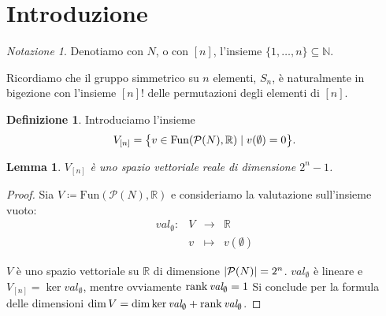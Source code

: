 \documentclass[a4paper,11pt]{article}
\theoremstyle{definition}				%
\newtheorem{definizione}{Definizione}%
\theoremstyle{remark}
\newtheorem*{notazione}{Notazione}
\theoremstyle{plain}
\newtheorem{lemma}{Lemma}%
\newcommand{\R}{\mathbb{R}}										%
\begin{document}
	\begin{abstract}
		In questo documento daremo la dimostrazione del Teorema di Shapley vista durante la lezione del 23/05/2023.
		
		Per dimostrare il teorema serviranno diversi risultati preliminari, non tutti visti a lezione.
		\smallskip

		Documento scritto e formattato in \LaTeX{} da Andrea Marino. 

		Ogni segnalazione di errori è più che bene accetta. Potete scrivermi per e-mail all'indirizzo 
		\texttt{a.marino47@studenti.unipi.it}
	\end{abstract}
	
	\section*{Introduzione}
	\begin{notazione}
		Denotiamo con $N$, o con $[n]$, l'insieme $\{1,\dots,n\}\subseteq\mathbb{N}$.
		
		Ricordiamo che il gruppo simmetrico su $n$ elementi, $S_n$, è naturalmente in bigezione con l'insieme $[n]!$ delle permutazioni degli elementi di $[n]$.
	\end{notazione}
	
	\begin{definizione}
		Introduciamo l'insieme 
		\[
			V_{[n]}=\qty\big{v\in\mathrm{Fun}\qty(\mathcal{P}(N),\R)\mid v(\emptyset)=0}.
		\]
	\end{definizione}
	
	\begin{lemma}\label{lemma:vectorspace}
		$V_{[n]}$ è uno spazio vettoriale reale di dimensione $2^n-1$.
	\end{lemma}
	\begin{proof}
		Sia $V\coloneqq\mathrm{Fun}\left(\mathcal{P}(N),\R\right)$ e consideriamo la valutazione sull'insieme vuoto: 
		\[
			\begin{array}{rccl}
				\mathit{val}_{\emptyset}\colon	& V	& \longrightarrow & \R\\
				 & v & \longmapsto & v\left(\emptyset\right)
			\end{array}	
		\]
		
		$V$ è uno spazio vettoriale su $\R$ di dimensione $\qty|\mathcal{P}(N)|=2^n$. $\mathit{val}_{\emptyset}$ è lineare e $V_{[n]}=\ker\textit{val}_{\emptyset}$, mentre ovviamente $\rank \textit{val}_{\emptyset}=1$ Si conclude per la formula delle dimensioni $\dim V = \dim\ker\textit{val}_{\emptyset}+\rank\textit{val}_{\emptyset}$.
	\end{proof}
	
\end{document}
